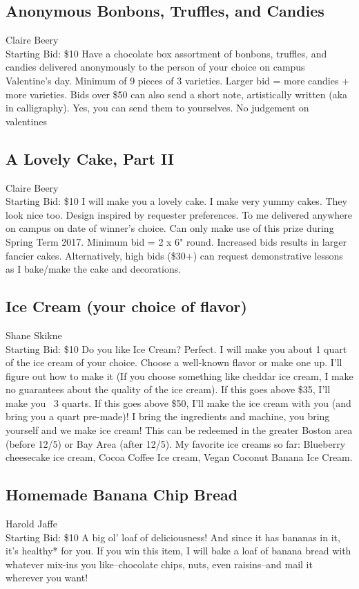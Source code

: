 \documentclass[11pt]{article}
\begin{document}
\subsection{Anonymous Bonbons, Truffles, and Candies}
Claire Beery
\\
Starting Bid: \$10
\newline
Have a chocolate box assortment of bonbons, truffles, and candies delivered anonymously to the person of your choice on campus Valentine's day. Minimum of 9 pieces of 3 varieties. Larger bid = more candies + more varieties. Bids over \$50 can also send a short note, artistically written (aka in calligraphy). Yes, you can send them to yourselves. No judgement on valentines
\subsection{A Lovely Cake, Part II}
Claire Beery
\\
Starting Bid: \$10
\newline
I will make you a lovely cake. I make very yummy cakes. They look nice too. Design inspired by requester preferences. To me delivered anywhere on campus on date of winner's choice. Can only make use of this prize during Spring Term 2017. Minimum bid = 2 x 6" round. Increased bids results in larger fancier cakes. Alternatively, high bids (\$30+) can request demonstrative lessons as I bake/make the cake and decorations.
\subsection{Ice Cream (your choice of flavor)}
Shane Skikne
\\
Starting Bid: \$10
\newline
Do you like Ice Cream? Perfect. I will make you about 1 quart of the ice cream of your choice. Choose a well-known flavor or make one up. I'll figure out how to make it (If you choose something like cheddar ice cream, I make no guarantees about the quality of the ice cream). If this goes above \$35, I'll make you ~3 quarts. If this goes above \$50, I'll make the ice cream with you (and bring you a quart pre-made)! I bring the ingredients and machine, you bring yourself and we make ice cream! This can be redeemed in the greater Boston area (before 12/5) or Bay Area (after 12/5). My favorite ice creams so far: Blueberry cheesecake ice cream, Cocoa Coffee Ice cream, Vegan Coconut Banana Ice Cream.
\subsection{Homemade Banana Chip Bread}
Harold Jaffe
\\
Starting Bid: \$10
\newline
A big ol' loaf of deliciousness! And since it has bananas in it, it's healthy* for you. If you win this item, I will bake a loaf of banana bread with whatever mix-ins you like--chocolate chips, nuts, even raisins--and mail it wherever you want!
\end{document}
